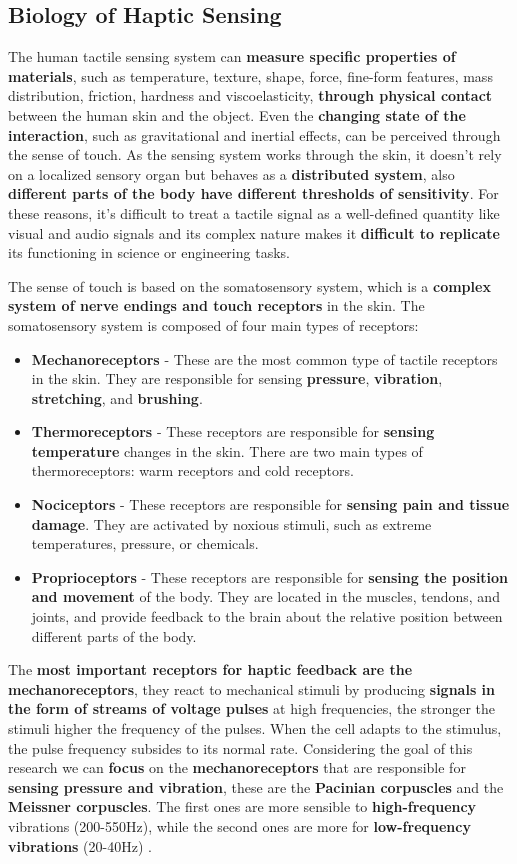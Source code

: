 \subsection{Biology of Haptic Sensing}
The human tactile sensing system can \textbf{measure specific properties of materials}, such as
temperature, texture, shape, force, fine-form features, mass distribution, friction, hardness
and viscoelasticity, \textbf{through physical contact} between the human skin and the object.
Even the \textbf{changing state of the interaction}, such as gravitational and inertial effects, can be perceived through the sense of touch. 
As the sensing system works through the skin, it doesn't rely on a localized sensory organ but behaves as a \textbf{distributed system}, also \textbf{different parts of the body have different thresholds of sensitivity}.
For these reasons, it's difficult to treat a tactile signal as a well-defined quantity like visual and audio signals and its complex nature makes it \textbf{difficult to replicate} its functioning in science or engineering tasks.

The sense of touch is based on the somatosensory system, which is a \textbf{ complex system of nerve endings and touch receptors} in the skin. The somatosensory system is composed of four main types of receptors:
\begin{itemize}
    \item \textbf{Mechanoreceptors} - These are the most common type of tactile receptors in the skin. They are responsible for sensing \textbf{pressure}, \textbf{vibration}, \textbf{stretching}, and \textbf{brushing}.
    \item \textbf{Thermoreceptors} - These receptors are responsible for \textbf{sensing temperature} changes in the skin. There are two main types of thermoreceptors: warm receptors and cold receptors.
    \item \textbf{Nociceptors} - These receptors are responsible for \textbf{sensing pain and tissue damage}. They are activated by noxious stimuli, such as extreme temperatures, pressure, or chemicals.
    \item \textbf{Proprioceptors} - These receptors are responsible for \textbf{sensing the position and movement} of the body. They are located in the muscles, tendons, and joints, and provide feedback to the brain about the relative position between different parts of the body.
\end{itemize}

The \textbf{most important receptors for haptic feedback are the mechanoreceptors}, they react to mechanical stimuli by producing \textbf{signals in the form of streams of voltage pulses} at high frequencies, the stronger the stimuli higher the frequency of the pulses. When the cell adapts to the stimulus, the pulse frequency subsides to its normal rate.
Considering the goal of this research we can \textbf{focus} on the \textbf{mechanoreceptors} that are responsible for \textbf{sensing pressure and vibration}, these are the \textbf{Pacinian corpuscles} and the \textbf{Meissner corpuscles}.
The first ones are more sensible to \textbf{high-frequency} vibrations (200-550Hz), while the second ones are more for \textbf{low-frequency vibrations} (20-40Hz) \cite{Alg_Wearable_Tech_Nicole}.